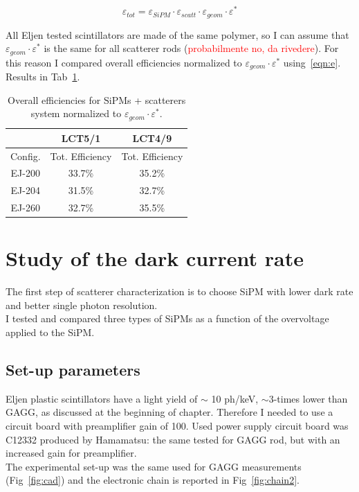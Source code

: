 \documentclass[10pt,a4paper, openany]{book}
\begin{document}
\begin{equation}
\varepsilon_{tot} = \varepsilon_{SiPM} \cdot \varepsilon_{scatt} \cdot \varepsilon_{geom} \cdot \varepsilon^*
\end{equation}

All Eljen tested scintillators are made of the same polymer, so I can assume that $\varepsilon_{geom} \cdot \varepsilon^*$ is the same for all scatterer rods (\textcolor{red}{probabilmente no, da rivedere}). For this reason I compared overall efficiencies normalized to $\varepsilon_{geom} \cdot \varepsilon^*$ using~\ref{eqn:e}. Results in Tab~\ref{tab:eff}.

\begin{center}
\begin{table}
\label{tab:eff}
\caption{Overall efficiencies for SiPMs + scatterers system normalized to $\varepsilon_{geom} \cdot \varepsilon^*$.}
\begin{tabular}{ccc}
 &\textbf{LCT5/1} & \textbf{LCT4/9} \\
\toprule
Config. & Tot. Efficiency & Tot. Efficiency\\
\midrule
EJ-200 & 33.7\% & 35.2\%\\
EJ-204 & 31.5\% & 32.7\% \\
EJ-260 & 32.7\% & 35.5\%\\
\bottomrule
\end{tabular}
\end{table}
\end{center}


\section{Study of the dark current rate}
The first step of scatterer characterization is to choose SiPM with lower dark rate and better single photon resolution.\\
I tested and compared three types of SiPMs as a function of the overvoltage applied to the SiPM.

\subsection{Set-up parameters}
Eljen plastic scintillators have a light yield of $\sim$ 10 ph/keV, $\sim 3$-times lower than GAGG, as discussed at the beginning of chapter. Therefore I needed to use a circuit board with preamplifier gain of 100. Used power supply circuit board was C12332 produced by Hamamatsu: the same tested for GAGG rod, but with an increased gain for preamplifier. \\
The experimental set-up was the same used for GAGG measurements (Fig~\ref{fig:cad}) and the electronic chain is reported in Fig~\ref{fig:chain2}.
\end{document}
